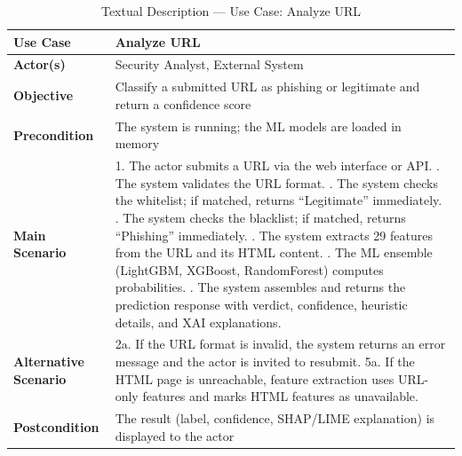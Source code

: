 \begin{table}[H]
\caption{Textual Description — Use Case: Analyze URL}
\label{tab:uc1}
\vspace{4pt}
\centering
\begin{tabular}{|p{3.5cm}|p{9cm}|}
\hline
\textbf{Use Case} & Analyze URL \\
\hline
\textbf{Actor(s)} & Security Analyst, External System \\
\hline
\textbf{Objective} & Classify a submitted URL as phishing or legitimate and return a confidence score \\
\hline
\textbf{Precondition} & The system is running; the ML models are loaded in memory \\
\hline
\textbf{Main Scenario} &
1. The actor submits a URL via the web interface or API. \newline
2. The system validates the URL format. \newline
3. The system checks the whitelist; if matched, returns ``Legitimate'' immediately. \newline
4. The system checks the blacklist; if matched, returns ``Phishing'' immediately. \newline
5. The system extracts 29 features from the URL and its HTML content. \newline
6. The ML ensemble (LightGBM, XGBoost, RandomForest) computes probabilities. \newline
7. The system assembles and returns the prediction response with verdict, confidence, heuristic details, and XAI explanations. \\
\hline
\textbf{Alternative Scenario} & 2a. If the URL format is invalid, the system returns an error message and the actor is invited to resubmit. \newline
5a. If the HTML page is unreachable, feature extraction uses URL-only features and marks HTML features as unavailable. \\
\hline
\textbf{Postcondition} & The result (label, confidence, SHAP/LIME explanation) is displayed to the actor \\
\hline
\end{tabular}
\end{table}

